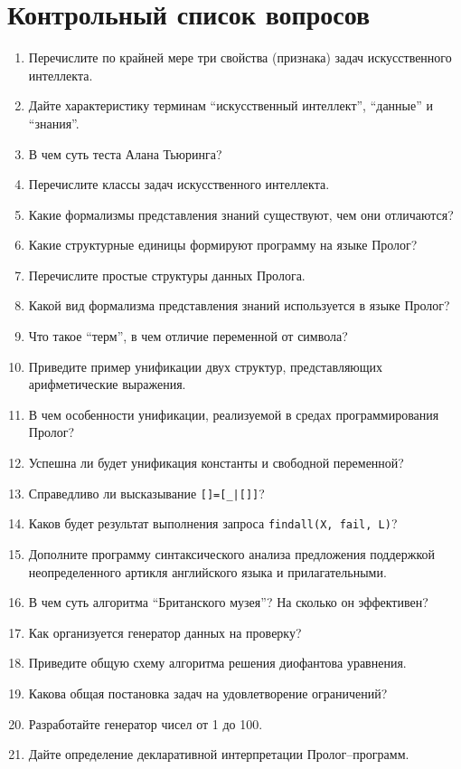 \documentclass[12pt, openany, twoside]{book} %
\begin{document}
\chapter*{Контрольный список вопросов}
\begin{enumerate}
\item{} Перечислите по крайней мере три свойства (признака) задач искусственного интеллекта.
\item{} Дайте характеристику терминам ``искусственный интеллект'', ``данные'' и ``знания''.
\item{} В чем суть теста Алана Тьюринга?
\item{} Перечислите классы задач искусственного интеллекта.
\item{} Какие формализмы представления знаний существуют, чем они отличаются?
\item{} Какие структурные единицы формируют программу на языке Пролог?
\item{} Перечислите простые структуры данных Пролога.
\item{} Какой вид формализма представления знаний используется в языке Пролог?
\item{} Что такое ``терм'', в чем отличие переменной от символа?
\item{} Приведите пример унификации двух структур, представляющих арифметические выражения.
\item{} В чем особенности унификации, реализуемой в средах программирования Пролог?
\item{} Успешна ли будет унификация константы и свободной переменной?
\item{} Справедливо ли высказывание \texttt{[]=[\_|[]]}?
\item{} Каков будет результат выполнения запроса \texttt{findall(X, fail, L)}?
\item{} Дополните программу синтаксического анализа предложения поддержкой неопределенного артикля английского языка и прилагательными.
\item{} В чем суть алгоритма ``Британского музея''? На сколько он эффективен?
\item{} Как организуется генератор данных на проверку?
\item{} Приведите общую схему алгоритма решения диофантова уравнения.
\item{} Какова общая постановка задач на удовлетворение ограничений?
\item{} Разработайте генератор чисел от 1 до 100.
\item{} Дайте определение декларативной интерпретации Пролог--про\-грамм.

\end{enumerate}
\end{document}
